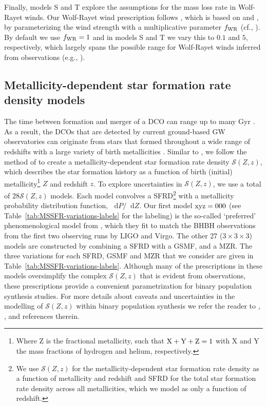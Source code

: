 \documentclass[fleqn,usenatbib]{mnras}
\newcommand{\Zi}{\ensuremath{Z}\xspace}
\newcommand{\SFRD}{\ensuremath{\mathcal{S}(Z,z)}\xspace}
\newcommand*\diff{\mathop{}\!\mathrm{d}}
\newcommand{\NmodelsMSSFR}{\ensuremath{28}\xspace}
\begin{document}
Finally, models S and T explore the assumptions for the mass loss rate in Wolf-Rayet winds. Our Wolf-Rayet wind prescription follows \citet{Belczynski:2010}, which is based on \citet{1998A&A...335.1003H} and  \citet{2005A&A...442..587V}, by parameterizing the wind strength with a multiplicative parameter $f_{\rm{WR}}$ (cf., \citealt{2018MNRAS.477.4685B}). By default we use $f_{\rm{WR}} = 1$ and in models S and T we vary this to $0.1$ and $5$, respectively, which largely spans the possible range for Wolf-Rayet winds inferred from observations (e.g., \citealt{Vink:2017,2019A&A...625A..57H,2019A&A...627A.151S,Sander:2020}). %


\subsection{Metallicity-dependent star formation rate density models}
\label{sec:method-metallicity-specific-star-formation-rate-density-prescription}

The time between formation and merger of a \ac{DCO} can range up to many Gyr \citep[e.g.,][]{Neijssel:2019}. 
As a result, the \acp{DCO} that are detected by current ground-based \ac{GW} observatories can originate from stars that formed throughout a wide range of redshifts with a large variety of birth metallicities \citep[e.g.,][]{Chruslinska:2019obsSFRD}. Similar to  , we follow the method of \citet{Neijssel:2019} to create a metallicity-dependent star formation rate density \SFRD, which describes the star formation history as a function of birth (initial) metallicity\footnote{Where Z is the fractional metallicity, such that $\rm{X}+\rm{Y}+\rm{Z}=1$ with X and Y the mass fractions of hydrogen and helium, respectively.} \Zi and redshift $z$. To explore uncertainties in \SFRD, we use a total of \NmodelsMSSFR \SFRD models. Each model convolves a \ac{SFRD}\footnote{We use \SFRD for the metallicity-dependent star formation rate density as a function of metallicity and redshift and \ac{SFRD} for the total star formation rate density across all metallicities, which we model as only a function of redshift.} with a metallicity probability distribution function, $\diff P / \diff \Zi $.  Our first model $\rm{xyz}=000$ (see Table~\ref{tab:MSSFR-variations-labels} for the labeling) is the so-called  `preferred' phenomenological model from \citet{Neijssel:2019}, which they fit to match the \ac{BHBH} observations from the first two observing runs by LIGO and Virgo.  
The other 27 ($3\times 3\times 3$) models are constructed by combining a \ac{SFRD} with a \ac{GSMF}, and a \ac{MZR}. The three variations for each \ac{SFRD}, \ac{GSMF} and \ac{MZR} that we consider are given in Table~\ref{tab:MSSFR-variations-labels}. Although many of the prescriptions in these models oversimplify the complex \SFRD that is evident from observations, these prescriptions provide a convenient parametrization for binary population synthesis studies. For more details about caveats and uncertainties in the modelling of \SFRD within binary population synthesis we refer the reader to \citet{Chruslinska:2019obsSFRD}, \citet{Neijssel:2019}, \citet{Boco:2021} and references therein.
\end{document}
